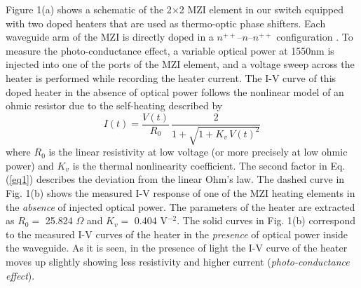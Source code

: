 Figure 1(a) shows a schematic of the 2$\times$2 MZI element in our switch equipped with two doped heaters that are used as thermo-optic phase shifters. Each waveguide arm of the MZI is directly doped in a $n^{++}$--$n$--$n^{++}$ configuration \cite{Streshinsky}. To measure the photo-conductance effect, a variable optical power at 1550nm is injected into one of the ports of the MZI element, and a voltage sweep across the heater is performed while recording the heater current. The I-V curve of this doped heater in the absence of optical power follows the nonlinear model of an ohmic resistor due to the self-heating \cite{Bahadori_Self_heating} described by
%
\begin{equation}
\label{eq1}
I(t) = \frac{V(t)}{R_0} \, \frac{2}{1+\sqrt{1+K_v \, V(t)^2}}
\end{equation}
%
where $R_0$ is the linear resistivity at low voltage (or more precisely at low ohmic power) and $K_v$ is the thermal nonlinearity coefficient. The second factor in Eq. (\ref{eq1}) describes the deviation from the linear Ohm's law. The dashed curve in Fig. 1(b) shows the measured I-V response of one of the MZI heating elements in the \textit{absence} of injected optical power. The parameters of the heater are extracted as $R_0 = $  25.824 $\Omega$ and $K_v = $ 0.404 V$^{-2}$. The solid curves in Fig. 1(b) correspond to the measured I-V curves of the heater in the \textit{presence} of optical power inside the waveguide. As it is seen, in the presence of light the I-V curve of the heater moves up slightly showing less resistivity and higher current (\textit{photo-conductance effect}). 

